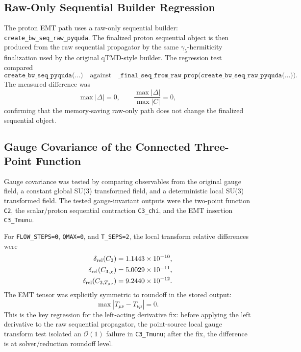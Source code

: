 \documentclass[11pt,a4paper]{article}
\begin{document}
\subsection{Raw-Only Sequential Builder Regression}

The proton EMT path uses a raw-only sequential builder:
\texttt{create\_bw\_seq\_raw\_pyquda}.  The finalized proton sequential object is
then produced from the raw sequential propagator by the same
$\gamma_{5}$-hermiticity finalization used by the original qTMD-style builder.
The regression test compared
\begin{equation}
  \texttt{create\_bw\_seq\_pyquda(...)}
  \quad\text{against}\quad
  \texttt{\_final\_seq\_from\_raw\_prop(create\_bw\_seq\_raw\_pyquda(...))}.
\end{equation}
The measured difference was
\begin{equation}
  \max |\Delta| = 0,\qquad
  \frac{\max|\Delta|}{\max|C|} = 0,
\end{equation}
confirming that the memory-saving raw-only path does not change the finalized
sequential object.

\subsection{Gauge Covariance of the Connected Three-Point Function}

Gauge covariance was tested by comparing observables from the original gauge field,
a constant global SU(3) transformed field, and a deterministic local SU(3)
transformed field.  The tested gauge-invariant outputs were the two-point function
\texttt{C2}, the scalar/proton sequential contraction \texttt{C3\_chi}, and the EMT
insertion \texttt{C3\_Tmunu}.

For \texttt{FLOW\_STEPS=0}, \texttt{QMAX=0}, and \texttt{T\_SEPS=2}, the local
transform relative differences were
\begin{align}
  \delta_{\rm rel}(C_{2}) &= 1.1443\times 10^{-10},\\
  \delta_{\rm rel}(C_{3,\chi}) &= 5.0029\times 10^{-11},\\
  \delta_{\rm rel}(C_{3,T_{\mu\nu}}) &= 9.2440\times 10^{-12}.
\end{align}
The EMT tensor was explicitly symmetric to roundoff in the stored output:
\begin{equation}
  \max |T_{\mu\nu} - T_{\nu\mu}| = 0.
\end{equation}
This is the key regression for the left-acting derivative fix: before applying the
left derivative to the raw sequential propagator, the point-source local gauge
transform test isolated an $\mathcal{O}(1)$ failure in \texttt{C3\_Tmunu}; after
the fix, the difference is at solver/reduction roundoff level.
\end{document}

